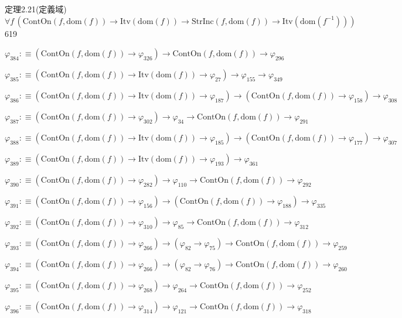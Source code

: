 \begin{fullproof}{定理2.21(定義域)}{$\forall f\,(\mathrm{ContOn}(f,\mathrm{dom}(f)) \to \mathrm{Itv}(\mathrm{dom}(f)) \to \mathrm{StrInc}(f,\mathrm{dom}(f)) \to \mathrm{Itv}(\mathrm{dom}(f^{-1})))$}{619}
\begin{abbrevlist}
\item $\varphi_{384} :\equiv (\mathrm{ContOn}(f,\mathrm{dom}(f)) \to \varphi_{326}) \to \mathrm{ContOn}(f,\mathrm{dom}(f)) \to \varphi_{296}$
\item $\varphi_{385} :\equiv (\mathrm{ContOn}(f,\mathrm{dom}(f)) \to \mathrm{Itv}(\mathrm{dom}(f)) \to \varphi_{27}) \to \varphi_{155} \to \varphi_{349}$
\item $\varphi_{386} :\equiv (\mathrm{ContOn}(f,\mathrm{dom}(f)) \to \mathrm{Itv}(\mathrm{dom}(f)) \to \varphi_{187}) \to (\mathrm{ContOn}(f,\mathrm{dom}(f)) \to \varphi_{158}) \to \varphi_{308}$
\item $\varphi_{387} :\equiv (\mathrm{ContOn}(f,\mathrm{dom}(f)) \to \varphi_{302}) \to \varphi_{34} \to \mathrm{ContOn}(f,\mathrm{dom}(f)) \to \varphi_{291}$
\item $\varphi_{388} :\equiv (\mathrm{ContOn}(f,\mathrm{dom}(f)) \to \mathrm{Itv}(\mathrm{dom}(f)) \to \varphi_{185}) \to (\mathrm{ContOn}(f,\mathrm{dom}(f)) \to \varphi_{177}) \to \varphi_{307}$
\item $\varphi_{389} :\equiv (\mathrm{ContOn}(f,\mathrm{dom}(f)) \to \mathrm{Itv}(\mathrm{dom}(f)) \to \varphi_{193}) \to \varphi_{361}$
\item $\varphi_{390} :\equiv (\mathrm{ContOn}(f,\mathrm{dom}(f)) \to \varphi_{282}) \to \varphi_{110} \to \mathrm{ContOn}(f,\mathrm{dom}(f)) \to \varphi_{292}$
\item $\varphi_{391} :\equiv (\mathrm{ContOn}(f,\mathrm{dom}(f)) \to \varphi_{156}) \to (\mathrm{ContOn}(f,\mathrm{dom}(f)) \to \varphi_{188}) \to \varphi_{335}$
\item $\varphi_{392} :\equiv (\mathrm{ContOn}(f,\mathrm{dom}(f)) \to \varphi_{310}) \to \varphi_{85} \to \mathrm{ContOn}(f,\mathrm{dom}(f)) \to \varphi_{312}$
\item $\varphi_{393} :\equiv (\mathrm{ContOn}(f,\mathrm{dom}(f)) \to \varphi_{266}) \to (\varphi_{82} \to \varphi_{75}) \to \mathrm{ContOn}(f,\mathrm{dom}(f)) \to \varphi_{259}$
\item $\varphi_{394} :\equiv (\mathrm{ContOn}(f,\mathrm{dom}(f)) \to \varphi_{266}) \to (\varphi_{82} \to \varphi_{76}) \to \mathrm{ContOn}(f,\mathrm{dom}(f)) \to \varphi_{260}$
\item $\varphi_{395} :\equiv (\mathrm{ContOn}(f,\mathrm{dom}(f)) \to \varphi_{268}) \to \varphi_{264} \to \mathrm{ContOn}(f,\mathrm{dom}(f)) \to \varphi_{252}$
\item $\varphi_{396} :\equiv (\mathrm{ContOn}(f,\mathrm{dom}(f)) \to \varphi_{314}) \to \varphi_{121} \to \mathrm{ContOn}(f,\mathrm{dom}(f)) \to \varphi_{318}$

\end{abbrevlist}
\end{fullproof}
